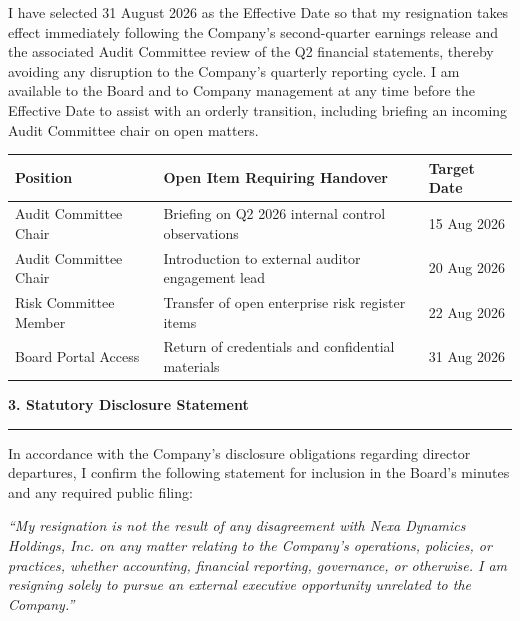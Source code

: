 \documentclass[english,11pt]{g-brief}
\newcommand{\lettersection}[1]{%
  \vspace{2.5mm}%
  {\color{BoardNavy}\Large\bfseries #1}\par%
  \vspace{0.5mm}%
  {\color{BrassGold}\hrule height 1pt}\par%
  \vspace{1.5mm}%
}
\begin{document}
\begin{g-brief}
I have selected 31 August 2026 as the Effective Date so that my resignation takes effect immediately following the Company's second-quarter earnings release and the associated Audit Committee review of the Q2 financial statements, thereby avoiding any disruption to the Company's quarterly reporting cycle. I am available to the Board and to Company management at any time before the Effective Date to assist with an orderly transition, including briefing an incoming Audit Committee chair on open matters.

\vspace{2.5mm}
\begin{center}
\small
\begin{tabularx}{\textwidth}{l X l}
\toprule
\textbf{Position} & \textbf{Open Item Requiring Handover} & \textbf{Target Date} \\
\midrule
Audit Committee Chair & Briefing on Q2 2026 internal control observations & 15 Aug 2026 \\{}
Audit Committee Chair & Introduction to external auditor engagement lead & 20 Aug 2026 \\{}
Risk Committee Member & Transfer of open enterprise risk register items & 22 Aug 2026 \\{}
Board Portal Access & Return of credentials and confidential materials & 31 Aug 2026 \\
\bottomrule
\end{tabularx}
\end{center}

\lettersection{3. Statutory Disclosure Statement}

In accordance with the Company's disclosure obligations regarding director departures, I confirm the following statement for inclusion in the Board's minutes and any required public filing:

\vspace{2.5mm}
\begin{tcolorbox}[
    colback=white,
    colframe=SlateGray,
    boxrule=0.8pt,
    arc=1.5mm,
    top=2.5mm,
    bottom=2.5mm,
    left=3.5mm,
    right=3.5mm,
    title=\textcolor{white}{\small\faLock\ \textbf{Disclosure for the Record}}
]
\textcolor{DarkText}{\itshape ``My resignation is not the result of any disagreement with Nexa Dynamics Holdings, Inc. on any matter relating to the Company's operations, policies, or practices, whether accounting, financial reporting, governance, or otherwise. I am resigning solely to pursue an external executive opportunity unrelated to the Company.''}
\end{tcolorbox}


\end{g-brief}
\end{document}
